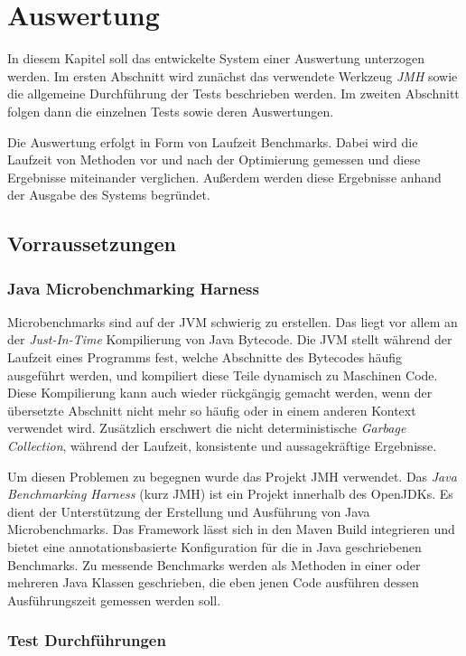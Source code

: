 \chapter{Auswertung}

In diesem Kapitel soll das entwickelte System einer Auswertung unterzogen werden.
Im ersten Abschnitt wird zunächst das verwendete Werkzeug \textit{JMH} sowie 
die allgemeine Durchführung der Tests beschrieben werden. Im zweiten Abschnitt 
folgen dann die einzelnen Tests sowie deren Auswertungen.

Die Auswertung erfolgt in Form von Laufzeit Benchmarks. Dabei wird die Laufzeit von 
Methoden vor und nach der Optimierung gemessen und diese Ergebnisse miteinander verglichen. 
Außerdem werden diese Ergebnisse anhand der Ausgabe des Systems begründet.

\section{Vorraussetzungen}

\subsection{Java Microbenchmarking Harness}

Microbenchmarks sind auf der JVM schwierig zu erstellen. Das liegt vor allem 
an der \textit{Just-In-Time} Kompilierung von Java Bytecode. Die JVM stellt 
während der Laufzeit eines Programms fest, welche Abschnitte des Bytecodes 
häufig ausgeführt werden, und kompiliert diese Teile dynamisch zu Maschinen Code.
Diese Kompilierung kann auch wieder rückgängig gemacht werden, wenn der übersetzte
Abschnitt nicht mehr so häufig oder in einem anderen Kontext verwendet wird. Zusätzlich 
erschwert die nicht deterministische \textit{Garbage Collection}, während der 
Laufzeit, konsistente und aussagekräftige Ergebnisse.

Um diesen Problemen zu begegnen wurde das Projekt JMH verwendet. Das \textit{Java Benchmarking Harness} 
(kurz JMH) ist ein Projekt innerhalb des OpenJDKs. Es dient der Unterstützung der 
Erstellung und Ausführung von Java Microbenchmarks. Das Framework lässt sich in 
den Maven Build integrieren und bietet eine annotationsbasierte Konfiguration 
für die in Java geschriebenen Benchmarks. Zu messende Benchmarks werden als Methoden 
in einer oder mehreren Java Klassen geschrieben, die eben jenen Code ausführen dessen Ausführungszeit 
gemessen werden soll. 

\subsection{Test Durchführungen}

